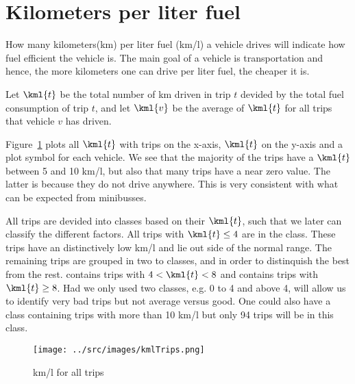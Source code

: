 \section{Kilometers per liter fuel}

How many kilometers(km) per liter fuel (km/l) a vehicle drives will indicate how fuel efficient the vehicle is.
The main goal of a vehicle is transportation and hence, the more kilometers one can drive per liter fuel, the cheaper it is.

Let $\kml{t}$ be the total number of km driven in trip $t$ devided by the total fuel consumption of trip $t$, and let $\kml{v}$ be the average of $\kml{t}$ for all trips that vehicle $v$ has driven.

Figure~\ref{fig:kmlTrips} plots all $\kml{t}$ with trips on the x-axis, $\kml{t}$ on the y-axis and a plot symbol for each vehicle.
We see that the majority of the trips have a $\kml{t}$ between 5 and 10 km/l, but also that many trips have a near zero value.
The latter is because they do not drive anywhere.
This is very consistent with what can be expected from minibusses.

All trips are devided into classes based on their $\kml{t}$, such that we later can classify the different factors. %
All trips with $\kml{t}\leq4$ are in the \fuelLow class. These trips have an distinctively low km/l and lie out side of the normal range. 
The remaining trips are grouped in two to classes, \fuelMedium and \fuelHigh in order to distinquish the best from the rest.
\fuelMedium contains trips with $4 < \kml{t} < 8$ and \fuelHigh contains trips with $\kml{t}\geq8$.
Had we only used two classes, e.g. 0 to 4 and above 4, will allow us to identify very bad trips but not average versus good. 
One could also have a class containing trips with more than 10 km/l but only 94 trips will be in this class. %
\begin{figure}[htb]
\centering
\texttt{[image: ../src/images/kmlTrips.png]}
\caption{km/l for all trips}
\label{fig:kmlTrips}
\end{figure}

